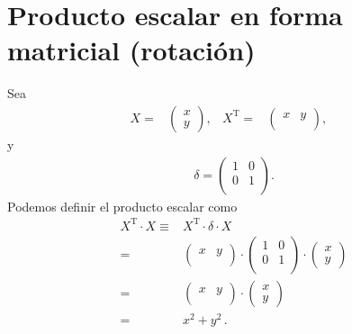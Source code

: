 \documentclass[11pt,a4paper]{article}
\begin{document}
\section{Producto escalar en forma matricial (rotación)}
Sea 
\begin{align*}
    X =& \begin{pmatrix}
        x\\  
        y
    \end{pmatrix},&
    X^{\operatorname{T}} =& 
    \begin{pmatrix}
        x&y\\
    \end{pmatrix},&
\end{align*}
y
\begin{align*}
    \delta = \begin{pmatrix}
        1 & 0\\
        0 & 1\\
    \end{pmatrix}.
\end{align*}
Podemos definir el producto escalar como
\begin{align*}
    X^{\operatorname{T}}\cdot X 
   \equiv & X^{\operatorname{T}}\cdot \delta \cdot X \\
   = &\begin{pmatrix}
        x&y\\
    \end{pmatrix}\cdot  \begin{pmatrix}
        1 & 0\\
        0 & 1\\
    \end{pmatrix} \cdot \begin{pmatrix}
        x\\  
        y
    \end{pmatrix} \\
   = &\begin{pmatrix}
        x&y\\
    \end{pmatrix}\cdot \begin{pmatrix}
        x\\  
        y
    \end{pmatrix} \\
= & x^2 +y ^2\,.
\end{align*}

\newpage
\end{document}
